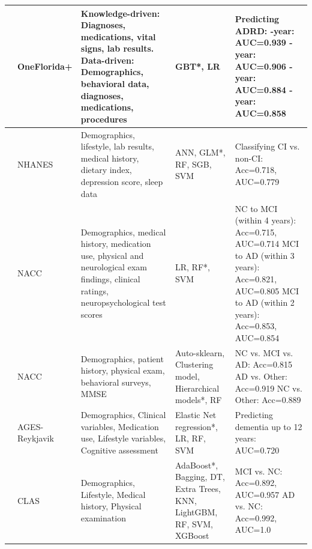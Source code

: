 \begin{landscape}
\begin{longtable}{|M{0.15\textwidth}|M{0.15\textwidth}|M{0.4\textwidth}|M{0.3\textwidth}|M{0.5\textwidth}|}
\cite{Li2023Early} & OneFlorida+ & Knowledge-driven: Diagnoses, medications, vital signs, lab results. Data-driven: Demographics, behavioral data, diagnoses, medications, procedures & GBT*, LR & Predicting ADRD: -year: AUC=0.939 -year: AUC=0.906 -year: AUC=0.884 -year: AUC=0.858 \\ 
\hline

\cite{Li2023Machine} & NHANES & Demographics, lifestyle, lab results, medical history, dietary index, depression score, sleep data & ANN, GLM*, RF, SGB, SVM & Classifying CI vs. non-CI: Acc=0.718, AUC=0.779 \\ 
\hline

\cite{Pang2023Predicting} & NACC & Demographics, medical history, medication use, physical and neurological exam findings, clinical ratings, neuropsychological test scores & LR, RF*, SVM & NC to MCI (within 4 years): Acc=0.715, AUC=0.714 \newline MCI to AD (within 3 years): Acc=0.821, AUC=0.805 \newline MCI to AD (within 2 years): Acc=0.853, AUC=0.854 \\ 
\hline

\cite{Ren2023Improving} & NACC & Demographics, patient history, physical exam, behavioral surveys, MMSE & Auto-sklearn, Clustering model, Hierarchical models*, RF & NC vs. MCI vs. AD: Acc=0.815 \newline AD vs. Other: Acc=0.919 \newline NC vs. Other: Acc=0.889 \\ 
\hline

\cite{Twait2023Dementia} & AGES-Reykjavik & Demographics, Clinical variables, Medication use, Lifestyle variables, Cognitive assessment & Elastic Net regression*, LR, RF, SVM & Predicting dementia up to 12 years: AUC=0.720 \\ 
\hline

\cite{Yue2023Explainable} & CLAS & Demographics, Lifestyle, Medical history, Physical examination & AdaBoost*, Bagging, DT, Extra Trees, KNN, LightGBM, RF, SVM, XGBoost & MCI vs. NC: Acc=0.892, AUC=0.957 \newline AD vs. NC: Acc=0.992, AUC=1.0 \\ 
\hline


\end{longtable}
\end{landscape}
